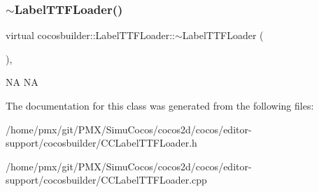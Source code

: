 \subsubsection{\texorpdfstring{$\sim$\+Label\+T\+T\+F\+Loader()}{~LabelTTFLoader()}\hspace{0.1cm}{\footnotesize\ttfamily [2/2]}}
{\footnotesize\ttfamily virtual cocosbuilder\+::\+Label\+T\+T\+F\+Loader\+::$\sim$\+Label\+T\+T\+F\+Loader (\begin{DoxyParamCaption}{ }\end{DoxyParamCaption})\hspace{0.3cm}{\ttfamily [inline]}, {\ttfamily [virtual]}}

NA  NA 

The documentation for this class was generated from the following files\+:\begin{DoxyCompactItemize}
\item 
/home/pmx/git/\+P\+M\+X/\+Simu\+Cocos/cocos2d/cocos/editor-\/support/cocosbuilder/C\+C\+Label\+T\+T\+F\+Loader.\+h\item 
/home/pmx/git/\+P\+M\+X/\+Simu\+Cocos/cocos2d/cocos/editor-\/support/cocosbuilder/C\+C\+Label\+T\+T\+F\+Loader.\+cpp\end{DoxyCompactItemize}
